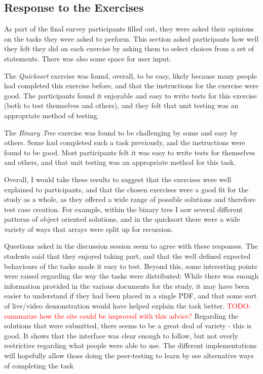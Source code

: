 \documentclass[a4paper,11pt]{report}
\newcommand{\todo}[1]{\textcolor{red}{TODO: #1}}
\begin{document}
\subsection{Response to the Exercises}
As part of the final survey participants filled out, they were asked their opinions on the tasks they were asked to perform. This section asked participants how well they felt they did on each exercise by asking them to select choices from a set of statements. There was also some space for user input.\par
The \textit{Quicksort} exercise was found, overall, to be easy, likely because many people had completed this exercise before, and that the instructions for the exercise were good. The participants found it enjoyable and easy to write tests for this exercise (both to test themselves and others), and they felt that unit testing was an appropriate method of testing.\par
The \textit{Binary Tree} exercise was found to be challenging by some and easy by others. Some had completed such a task previously, and the instructions were found to be good. Most participants felt it was easy to write tests for themselves and others, and that unit testing was an appropriate method for this task.\par
Overall, I would take these results to suggest that the exercises were well explained to participants, and that the chosen exercises were a good fit for the study as a whole, as they offered a wide range of possible solutions and therefore test case creation. For example, within the binary tree I saw several different patterns of object oriented solutions, and in the quicksort there were a wide variety of ways that arrays were split up for recursion.\par
Questions asked in the discussion session seem to agree with these responses. The students said that they enjoyed taking part, and that the well defined expected behaviours of the tasks made it easy to test. Beyond this, some interesting points were raised regarding the way the tasks were distributed: While there was enough information provided in the various documents for the study, it may have been easier to understand if they had been placed in a single PDF, and that some sort of live/video demonstration would have helped explain the task better. \todo{summarize how the site could be improved with this advice?}
Regarding the solutions that were submitted, there seems to be a great deal of variety - this is good. It shows that the interface was clear enough to follow, but not overly restrictive regarding what people were able to use. The different implementations will hopefully allow those doing the peer-testing to learn by see alternative ways of completing the task\par
\end{document}

